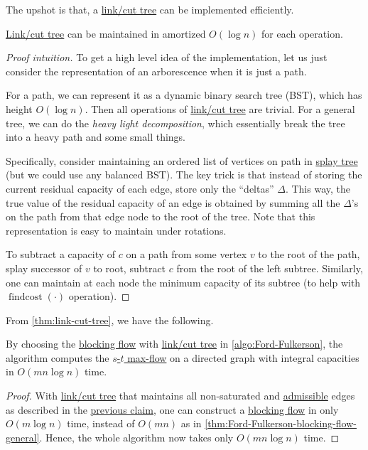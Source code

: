 The upshot is that, a \hyperref[def:link-cut-tree]{link/cut tree} can be implemented efficiently.

\begin{theorem}\label{thm:link-cut-tree}
	\hyperref[def:link-cut-tree]{Link/cut tree} can be maintained in amortized \(O(\log n)\) for each operation.
\end{theorem}
\begin{proof}[Proof intuition]
	To get a high level idea of the implementation, let us just consider the representation of an arborescence when it is just a path.
	\begin{intuition}
		For a path, we can represent it as a dynamic binary search tree (BST), which has height \(O(\log n)\). Then all operations of \hyperref[def:link-cut-tree]{link/cut tree} are trivial. For a general tree, we can do the \emph{heavy light decomposition}, which essentially break the tree into a heavy path and some small things.
	\end{intuition}
	Specifically, consider maintaining an ordered list of vertices on path in \href{https://en.wikipedia.org/wiki/Splay_tree}{splay tree} (but we could use any balanced BST). The key trick is that instead of storing the current residual capacity of each edge, store only the ``deltas'' \(\Delta \). This way, the true value of the residual capacity of an edge is obtained by summing all the \(\Delta \)'s on the path from that edge node to the root of the tree. Note that this representation is easy to maintain under rotations.

	To subtract a capacity of \(c\) on a path from some vertex \(v\) to the root of the path, splay successor of \(v\) to root, subtract \(c\) from the root of the left subtree. Similarly, one can maintain at each node the minimum capacity of its subtree (to help with \(\operatorname{findcost}(\cdot) \) operation).
\end{proof}


From \autoref{thm:link-cut-tree}, we have the following.

\begin{theorem}\label{thm:Ford-Fulkerson-link-cut-tree}
	By choosing the \hyperref[def:blocking-flow]{blocking flow} with \hyperref[def:link-cut-tree]{link/cut tree} in \autoref{algo:Ford-Fulkerson}, the algorithm computes the \hyperref[prb:s-t-max-flow]{\(s\)-\(t\) max-flow} on a directed graph with integral capacities in \(O(mn \log n)\) time.
\end{theorem}
\begin{proof}
	With \hyperref[def:link-cut-tree]{link/cut tree} that maintains all non-saturated and \hyperref[def:admissible]{admissible} edges as described in the \hyperref[clm:adaptive-DFS-link-cut-tree]{previous claim}, one can construct a \hyperref[def:blocking-flow]{blocking flow} in only \(O(m \log n)\) time, instead of \(O(mn)\) as in \autoref{thm:Ford-Fulkerson-blocking-flow-general}. Hence, the whole algorithm now takes only \(O(mn \log n)\) time.
\end{proof}

